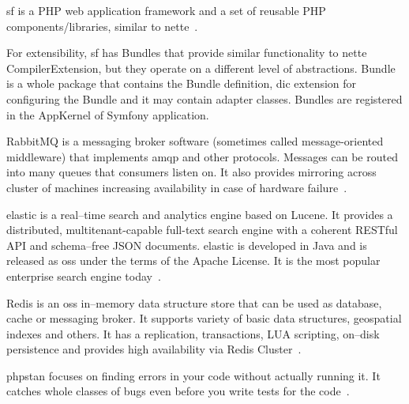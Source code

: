  \label{sec:theory:symfony}

\gls{sf} is a PHP web application framework and a set of reusable PHP components/libraries, similar to \gls{nette}~\cite{symfony:introduction}.

For extensibility, \gls{sf} has Bundles that provide similar functionality to \gls{nette} CompilerExtension, but they operate on a different level of abstractions. Bundle is a whole package that contains the Bundle definition, \gls{dic} extension for configuring the Bundle and it may contain adapter classes. Bundles are registered in the AppKernel of Symfony application.

 \label{sec:theory:rabbitmq}

RabbitMQ is a messaging broker software (sometimes called message-oriented middleware) that implements \gls{amqp} and other protocols. Messages can be routed into many queues that consumers listen on. It also provides mirroring across cluster of machines increasing availability in case of hardware failure~\cite{rabbitmq:features}.

 \label{sec:theory:elasticsearch}

\gls{elastic} is a real--time search and analytics engine based on Lucene. It provides a distributed, multitenant-capable full-text search engine with a coherent RESTful API and schema--free JSON documents. \gls{elastic} is developed in Java and is released as \gls{oss} under the terms of the Apache License. It is the most popular enterprise search engine today~\cite{gormley2015elasticsearch}.

 \label{sec:theory:redis}

Redis is an \gls{oss} in--memory data structure store that can be used as database, cache or messaging broker. It supports variety of basic data structures, geospatial indexes and others. It has a replication, transactions, LUA scripting, on--disk persistence and provides high availability via Redis Cluster~\cite{redis:about}.

 \label{sec:theory:phpstan}

\gls{phpstan} focuses on finding errors in your code without actually running it. It catches whole classes of bugs even before you write tests for the code~\cite{github:phpstan}.

 \label{sec:theory:psr}

